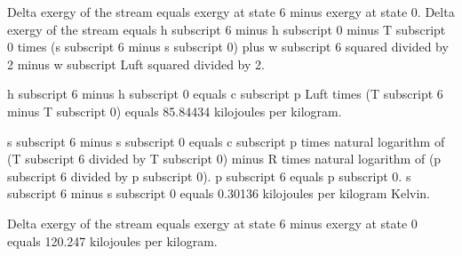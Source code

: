 Delta exergy of the stream equals exergy at state 6 minus exergy at state 0.  
Delta exergy of the stream equals h subscript 6 minus h subscript 0 minus T subscript 0 times (s subscript 6 minus s subscript 0) plus w subscript 6 squared divided by 2 minus w subscript Luft squared divided by 2.  

h subscript 6 minus h subscript 0 equals c subscript p Luft times (T subscript 6 minus T subscript 0) equals 85.84434 kilojoules per kilogram.  

s subscript 6 minus s subscript 0 equals c subscript p times natural logarithm of (T subscript 6 divided by T subscript 0) minus R times natural logarithm of (p subscript 6 divided by p subscript 0).  
p subscript 6 equals p subscript 0.  
s subscript 6 minus s subscript 0 equals 0.30136 kilojoules per kilogram Kelvin.  

Delta exergy of the stream equals exergy at state 6 minus exergy at state 0 equals 120.247 kilojoules per kilogram.